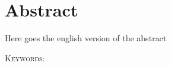 \thispagestyle{empty}
\chapter*{Abstract}

Here goes the english version of the abstract
\bigskip

\noindent \textsc{Keywords:} \textsf{}
